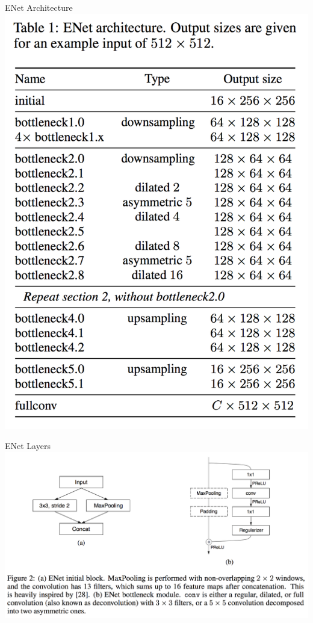 \documentclass[]{beamer}
\begin{document}
\begin{frame}{ENet Architecture}
\centering
\includegraphics[height=0.9\textheight]{figures/enet-architecture}
\end{frame}

\begin{frame}{ENet Layers}
\centering
\includegraphics[scale=0.325]{figures/enet-layers}
\end{frame}
\end{document}
